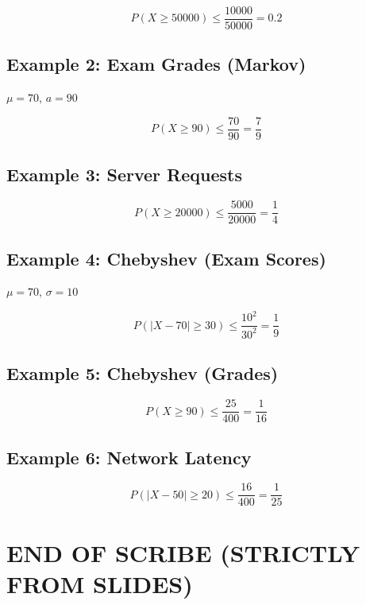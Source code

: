\documentclass[12pt]{article}
\begin{document}
\[
P(X \ge 50000) \le \frac{10000}{50000} = 0.2
\]

\subsection*{Example 2: Exam Grades (Markov)}

$\mu = 70$, $a = 90$

\[
P(X \ge 90) \le \frac{70}{90} = \frac{7}{9}
\]

\subsection*{Example 3: Server Requests}

\[
P(X \ge 20000) \le \frac{5000}{20000} = \frac{1}{4}
\]

\subsection*{Example 4: Chebyshev (Exam Scores)}

$\mu = 70$, $\sigma = 10$

\[
P(|X - 70| \ge 30) \le \frac{10^2}{30^2} = \frac{1}{9}
\]

\subsection*{Example 5: Chebyshev (Grades)}

\[
P(X \ge 90) \le \frac{25}{400} = \frac{1}{16}
\]

\subsection*{Example 6: Network Latency}

\[
P(|X - 50| \ge 20) \le \frac{16}{400} = \frac{1}{25}
\]

\section*{END OF SCRIBE (STRICTLY FROM SLIDES)}
\end{document}
